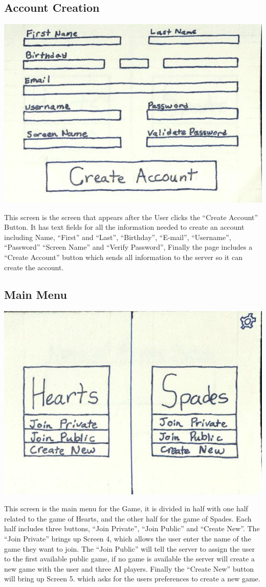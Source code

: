 \documentclass[]{scrartcl}
\begin{document}
\subsection{Account Creation}
\centerline{\includegraphics{2.jpg}}
This screen is the screen that appears after the User clicks the “Create Account” Button.  It has text fields for all the information needed to create an account including Name, “First” and “Last”, “Birthday”, “E-mail”, “Username”, “Password” “Screen Name” and “Verify Password”,  Finally the page includes a “Create Account” button which sends all information to the server so it can create the account.  

\subsection{Main Menu}
\centerline{\includegraphics{3.jpg}}
This screen is the main menu for the Game, it is divided in half with one half related to the game of Hearts, and the other half for the game of Spades.  Each half includes three buttons, “Join Private”, “Join Public” and “Create New”.  The “Join Private” brings up Screen 4, which allows the user enter the name of the game they want to join.  The “Join Public” will tell the server to assign the user to the first available  public game, if no game is available the server will create a new game with the user and three AI players.  Finally the “Create New” button will bring up Screen 5. which asks for the users preferences to create a new game.
\end{document}
